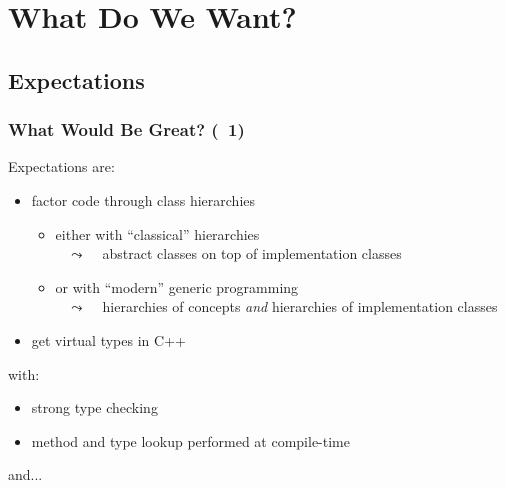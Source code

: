 
\section{What Do We Want?}

\subsection{Expectations}


\begin{frame}
  \frametitle{What Would Be Great? (\scoop~1)}

Expectations are:
\begin{itemize}
\item factor code through class hierarchies
  \begin{itemize}
  \item either with ``classical'' hierarchies\\
    ~ {\tiny{$\leadsto$ ~ abstract classes on top of implementation classes}}
  \item or with ``modern'' generic programming\\
    ~ {\tiny{$\leadsto$ ~ hierarchies of concepts \emph{and} hierarchies of implementation classes}}
  \end{itemize}
\item get virtual types in C++
\end{itemize}

\smallskip

with:
\begin{itemize}
\item strong type checking
\item method and type lookup performed at compile-time
\end{itemize}

\smallskip

and...

\end{frame}



